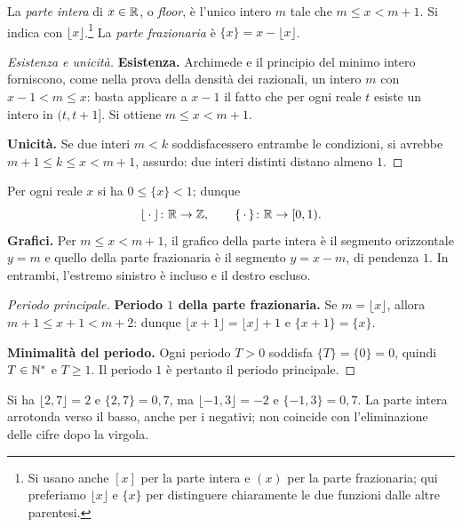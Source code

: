 \begin{definizione}
La \emph{parte intera} di $x\in\mathbb{R}$, o \emph{floor}, è l'unico intero $m$ tale che $m\le x<m+1$. Si indica con $\lfloor x\rfloor$.\footnote{Si usano anche $[x]$ per la parte intera e $(x)$ per la parte frazionaria; qui preferiamo $\lfloor x\rfloor$ e $\{x\}$ per distinguere chiaramente le due funzioni dalle altre parentesi.} La \emph{parte frazionaria} è $\{x\}=x-\lfloor x\rfloor$.
\end{definizione}

\begin{proof}[Esistenza e unicità]
\textbf{Esistenza.} Archimede e il principio del minimo intero forniscono, come nella prova della densità dei razionali, un intero $m$ con $x-1<m\le x$: basta applicare a $x-1$ il fatto che per ogni reale $t$ esiste un intero in $(t,t+1]$. Si ottiene $m\le x<m+1$.

\textbf{Unicità.} Se due interi $m<k$ soddisfacessero entrambe le condizioni, si avrebbe $m+1\le k\le x<m+1$, assurdo: due interi distinti distano almeno $1$.
\end{proof}

Per ogni reale $x$ si ha $0\le\{x\}<1$; dunque
\[
\lfloor\,\cdot\,\rfloor\colon\mathbb{R}\to\mathbb{Z},\qquad
\{\,\cdot\,\}\colon\mathbb{R}\to[0,1).
\]
\textbf{Grafici.} Per $m\le x<m+1$, il grafico della parte intera è il segmento orizzontale $y=m$ e quello della parte frazionaria è il segmento $y=x-m$, di pendenza $1$. In entrambi, l'estremo sinistro è incluso e il destro escluso.

\begin{proof}[Periodo principale]
\textbf{Periodo $1$ della parte frazionaria.} Se $m=\lfloor x\rfloor$, allora $m+1\le x+1<m+2$: dunque $\lfloor x+1\rfloor=\lfloor x\rfloor+1$ e $\{x+1\}=\{x\}$.

\textbf{Minimalità del periodo.} Ogni periodo $T>0$ soddisfa $\{T\}=\{0\}=0$, quindi $T\in\mathbb{N}^*$ e $T\ge1$. Il periodo $1$ è pertanto il periodo principale.
\end{proof}

\begin{esempio}
Si ha $\lfloor2{,}7\rfloor=2$ e $\{2{,}7\}=0{,}7$, ma $\lfloor-1{,}3\rfloor=-2$ e $\{-1{,}3\}=0{,}7$. La parte intera arrotonda verso il basso, anche per i negativi; non coincide con l'eliminazione delle cifre dopo la virgola.
\end{esempio}

